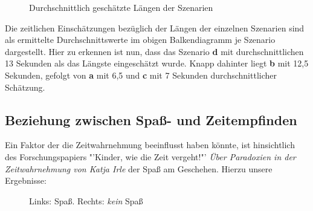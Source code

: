 \documentclass{Paper}
\begin{document}
       
\begin{figure}        [H]
\caption{Durchschnittlich geschätzte Längen der Szenarien}
\label{LaengeSzenarien}
\end{figure}

Die zeitlichen Einschätzungen bezüglich der Längen der einzelnen Szenarien sind als ermittelte Durchschnittswerte im obigen Balkendiagramm je Szenario dargestellt. Hier zu erkennen ist nun, dass das Szenario \textbf{d} mit durchschnittlichen 13 Sekunden als das Längste eingeschätzt wurde. Knapp dahinter liegt \textbf{b} mit 12,5 Sekunden, gefolgt von \textbf{a} mit 6,5 und \textbf{c} mit 7 Sekunden durchschnittlicher Schätzung.

\subsection{Beziehung zwischen Spaß- und Zeitempfinden}
Ein Faktor der die Zeitwahrnehmung beeinflusst haben könnte, ist hinsichtlich des Forschungspapiers "'Kinder, wie die Zeit vergeht!"'
\textit{Über Paradoxien in der Zeitwahrnehmung von Katja Irle} \cite{Irle2017} der Spaß am Geschehen.
Hierzu unsere Ergebnisse:
       
\begin{figure}[H]
\caption{Links: Spaß. Rechts: \textit{kein} Spaß}
\label{Spass}
\end{figure} %
\end{document}
